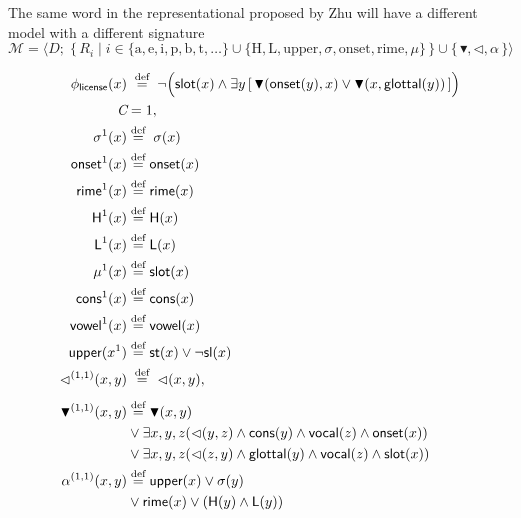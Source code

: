 \documentclass[11pt]{article}
\begin{document}
The same word  in the representational proposed by Zhu will have 
a different model with a different signature
\[
\mathcal{M}
= \langle 
D;\;
\{\, R_i \mid i \in 
\{\text{a}, \text{e}, \text{i}, \text{p}, \text{b}, \text{t}, \ldots\}
\cup
\{\text{H}, \text{L}, \text{upper}, \sigma, \text{onset}, \text{rime}, \mu \} \,\}
\cup
\{\,\blacktriangledown, \lhd, \alpha\,\}
\rangle
\]

\begin{align*}
\phi_{\textsf{license}}(x) &
\;\stackrel{\text{def}}{=}\;
\lnot\Big(
\mathsf{slot}(x) \wedge
\exists y \,[\, 
\blacktriangledown(\mathsf{onset}(y),x)
\vee
\blacktriangledown(x,\mathsf{glottal}(y))
\,]
\Big)\\
\textit{C} &= 1, \\
\sigma^1(x) & \stackrel{\text{def}}{=}\;\sigma(x)\\
\textsf{onset}^1 (x) & \stackrel{\text{def}}{=}\textsf{onset} (x) \\
\textsf{rime}^1 (x) & \stackrel{\text{def}}{=}\textsf{rime} (x) \\
\textsf{H}^1 (x) & \stackrel{\text{def}}{=}\textsf{H} (x) \\
\textsf{L}^1 (x) & \stackrel{\text{def}}{=}\textsf{L} (x) \\
\mu^1 (x) & \stackrel{\text{def}}{=}\textsf{slot} (x) \\
\textsf{cons}^1 (x) & \stackrel{\text{def}}{=} \textsf{cons} (x) \\
\textsf{vowel}^1 (x) & \stackrel{\text{def}}{=} \textsf{vowel} (x) \\
\textsf{upper}(x^1) & \stackrel{\text{def}}{=} \textsf{st}(x) \vee \lnot \textsf{sl}(x) \\
\lhd^{(1,1)}(x,y) &\;\stackrel{\text{def}}{=}\; \lhd(x,y), \\[4pt]
\blacktriangledown^{(1,1)}(x,y) &\stackrel{\text{def}}{=} \blacktriangledown(x,y) \\
								&\vee \exists x,y,z (\lhd(y,z) \wedge \textsf{cons}(y) \wedge \textsf{vocal}(z) \wedge \textsf{onset}(x))\\
								&\vee \exists x,y,z (\lhd(z,y) \wedge \textsf{glottal}(y) \wedge \textsf{vocal}(z) \wedge \textsf{slot}(x))\\
\alpha^{(1,1)}(x,y) &\stackrel{\text{def}}{=} \textsf{upper}(x) \vee \sigma(y)\\
					&\vee \textsf{rime}(x)\vee (\textsf{H}(y) \wedge\textsf{L}(y))
\end{align*}
\end{document}
